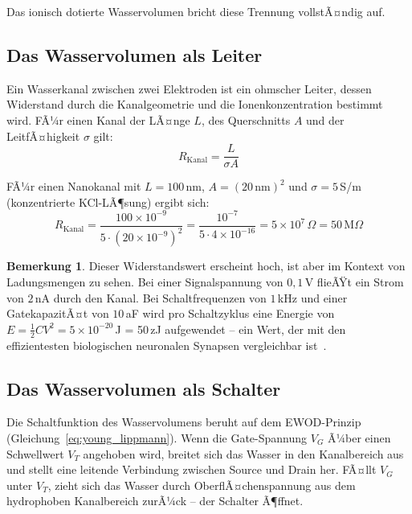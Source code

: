 ﻿\documentclass[a4paper,12pt]{scrreprt}
\theoremstyle{definition}
\newtheorem{bemerkung}{Bemerkung}[section]
\begin{document}
Das ionisch dotierte Wasservolumen bricht diese Trennung vollstÃ¤ndig auf.

\subsection{Das Wasservolumen als Leiter}

Ein Wasserkanal zwischen zwei Elektroden ist ein ohmscher Leiter, dessen
Widerstand durch die Kanalgeometrie und die Ionenkonzentration bestimmt wird.
FÃ¼r einen Kanal der LÃ¤nge $L$, des Querschnitts $A$ und der LeitfÃ¤higkeit
$\sigma$ gilt:
\begin{equation}
	R_{\mathrm{Kanal}} = \frac{L}{\sigma A}
	\label{eq:kanalwiderstand}
\end{equation}

FÃ¼r einen Nanokanal mit $L = 100$\,nm, $A = (20\,\text{nm})^2$ und
$\sigma = 5$\,S/m (konzentrierte KCl-LÃ¶sung) ergibt sich:
\begin{equation}
	R_{\mathrm{Kanal}} = \frac{100 \times 10^{-9}}{5 \cdot (20 \times 10^{-9})^2}
	= \frac{10^{-7}}{5 \cdot 4 \times 10^{-16}} = 5 \times 10^7\,\Omega = 50\,\text{M}\Omega
	\label{eq:beispiel_widerstand}
\end{equation}

\begin{bemerkung}
	Dieser Widerstandswert erscheint hoch, ist aber im Kontext von
	Ladungsmengen zu sehen. Bei einer Signalspannung von $0{,}1$\,V flieÃŸt
	ein Strom von $2$\,nA durch den Kanal. Bei Schaltfrequenzen von $1$\,kHz
	und einer GatekapazitÃ¤t von $10$\,aF wird pro Schaltzyklus eine Energie von
	$E = \frac{1}{2}CV^2 = 5 \times 10^{-20}$\,J = 50\,zJ aufgewendet -- ein
	Wert, der mit den effizientesten biologischen neuronalen Synapsen
	vergleichbar ist~\cite{laughlin2001}.
\end{bemerkung}

\subsection{Das Wasservolumen als Schalter}

Die Schaltfunktion des Wasservolumens beruht auf dem EWOD-Prinzip
(Gleichung~\ref{eq:young_lippmann}). Wenn die Gate-Spannung $V_G$ Ã¼ber einen
Schwellwert $V_T$ angehoben wird, breitet sich das Wasser in den Kanalbereich
aus und stellt eine leitende Verbindung zwischen Source und Drain her. FÃ¤llt
$V_G$ unter $V_T$, zieht sich das Wasser durch OberflÃ¤chenspannung aus dem
hydrophoben Kanalbereich zurÃ¼ck -- der Schalter Ã¶ffnet.
\end{document}
